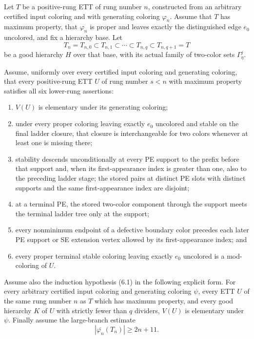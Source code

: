 \begin{lemma}
Let $T$ be a positive-rung ETT of rung number $n$, constructed from an
arbitrary certified input coloring and with generating coloring
$\varphi_n$.  Assume that $T$ has maximum property, that $\varphi_n$ is
proper and leaves exactly the distinguished edge $e_0$ uncolored, and
fix a hierarchy base.  Let
\[
 T_n=T_{n,0}\subset T_{n,1}\subset\cdots\subset
 T_{n,q}\subset T_{n,q+1}=T
\]
be a good hierarchy $H$ over that base, with its actual family of
two-color sets $\Gamma^j_\eta$.

Assume, uniformly over every certified input coloring and generating
coloring, that every positive-rung ETT $U$ of rung number $s<n$ with
maximum property satisfies all six lower-rung assertions:
\begin{enumerate}
\item $V(U)$ is elementary under its generating coloring;
\item under every proper coloring leaving exactly $e_0$ uncolored and
stable on the final ladder closure, that closure is interchangeable for
two colors whenever at least one is missing there;
\item stability descends unconditionally at every PE support to the prefix before
that support and, when its first-appearance index is greater than one, also
to the preceding ladder stage; the stored pairs at
distinct PE slots with distinct supports and the same first-appearance
index are disjoint;
\item at a terminal PE, the stored two-color component through the
support meets the terminal ladder tree only at the support;
\item every nonminimum endpoint of a defective boundary color precedes
each later PE support or SE extension vertex allowed by its
first-appearance index; and
\item every proper terminal stable coloring leaving exactly $e_0$
uncolored is a mod-coloring of $U$.
\end{enumerate}

Assume also the induction hypothesis (6.1) in the following explicit
form.  For every arbitrary certified input coloring and generating
coloring $\psi$, every ETT $U$ of the same rung number $n$ as $T$ which
has maximum property, and every good hierarchy $K$ of $U$ with strictly
fewer than $q$ dividers, $V(U)$ is elementary under $\psi$.  Finally
assume the large-branch estimate
\[
              |\overline{\varphi_n}(T_n)|\geq 2n+11.       \tag{L}
\]


\end{lemma}
